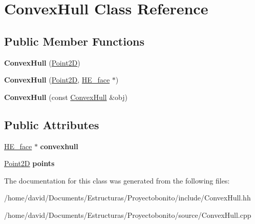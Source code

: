 \hypertarget{class_convex_hull}{\section{Convex\-Hull Class Reference}
\label{class_convex_hull}
}
\subsection*{Public Member Functions}
\begin{DoxyCompactItemize}
\item 
\hypertarget{class_convex_hull_ab35ffd84a05135cf8e4c6f98db103274}{{\bfseries Convex\-Hull} (\hyperlink{class_point2_d}{Point2\-D})}\label{class_convex_hull_ab35ffd84a05135cf8e4c6f98db103274}

\item 
\hypertarget{class_convex_hull_a3c2424e4f2e68b38285a236ea33014fe}{{\bfseries Convex\-Hull} (\hyperlink{class_point2_d}{Point2\-D}, \hyperlink{class_h_e__face}{H\-E\-\_\-face} $\ast$)}\label{class_convex_hull_a3c2424e4f2e68b38285a236ea33014fe}

\item 
\hypertarget{class_convex_hull_abd4e80afef71c40593d8c50233bde05d}{{\bfseries Convex\-Hull} (const \hyperlink{class_convex_hull}{Convex\-Hull} \&obj)}\label{class_convex_hull_abd4e80afef71c40593d8c50233bde05d}

\end{DoxyCompactItemize}
\subsection*{Public Attributes}
\begin{DoxyCompactItemize}
\item 
\hypertarget{class_convex_hull_a0ff31f4508984cd36c2558b517c4d9ac}{\hyperlink{class_h_e__face}{H\-E\-\_\-face} $\ast$ {\bfseries convexhull}}\label{class_convex_hull_a0ff31f4508984cd36c2558b517c4d9ac}

\item 
\hypertarget{class_convex_hull_a8e0b5b3ce10734fac4c08d219b942928}{\hyperlink{class_point2_d}{Point2\-D} {\bfseries points}}\label{class_convex_hull_a8e0b5b3ce10734fac4c08d219b942928}

\end{DoxyCompactItemize}


The documentation for this class was generated from the following files\-:\begin{DoxyCompactItemize}
\item 
/home/david/\-Documents/\-Estructuras/\-Proyectobonito/include/Convex\-Hull.\-hh\item 
/home/david/\-Documents/\-Estructuras/\-Proyectobonito/source/Convex\-Hull.\-cpp\end{DoxyCompactItemize}
